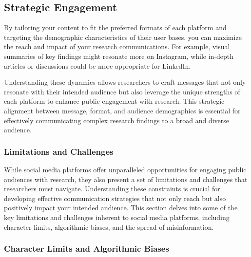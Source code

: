 \documentclass[
]{book}
\begin{document}
\hypertarget{strategic-engagement}{%
\subsection{Strategic Engagement}\label{strategic-engagement}}

By tailoring your content to fit the preferred formats of each platform and targeting the demographic characteristics of their user bases, you can maximize the reach and impact of your research communications. For example, visual summaries of key findings might resonate more on Instagram, while in-depth articles or discussions could be more appropriate for LinkedIn.

Understanding these dynamics allows researchers to craft messages that not only resonate with their intended audience but also leverage the unique strengths of each platform to enhance public engagement with research. This strategic alignment between message, format, and audience demographics is essential for effectively communicating complex research findings to a broad and diverse audience.

\hypertarget{limitations-and-challenges}{%
\subsubsection{Limitations and Challenges}\label{limitations-and-challenges}}

While social media platforms offer unparalleled opportunities for engaging public audiences with research, they also present a set of limitations and challenges that researchers must navigate. Understanding these constraints is crucial for developing effective communication strategies that not only reach but also positively impact your intended audience. This section delves into some of the key limitations and challenges inherent to social media platforms, including character limits, algorithmic biases, and the spread of misinformation.

\hypertarget{character-limits-and-algorithmic-biases}{%
\subsubsection{Character Limits and Algorithmic Biases}\label{character-limits-and-algorithmic-biases}}
\end{document}
